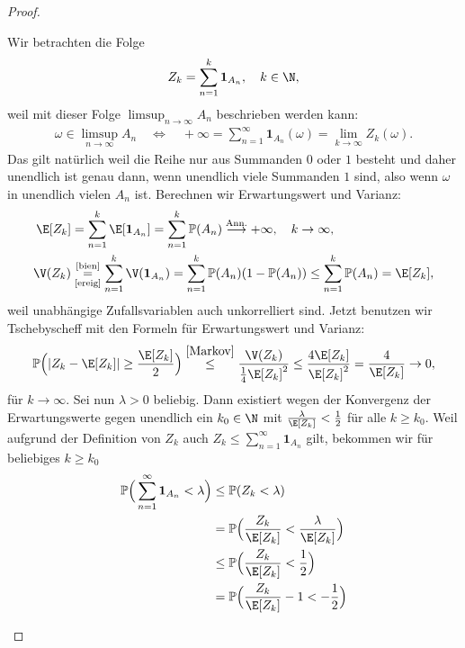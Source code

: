 \begin{proof}
\begin{enumerate}[label=(\roman*)]
		Wir betrachten die Folge
		\[ Z_k = \sum\limits_{n=1}^{k} \mathbf{1}_{A_n},\quad k\in\N, \]
		weil mit dieser Folge $\limsup_{n\to\infty} A_n$ beschrieben werden kann:
		\begin{align}\label{kyp}
			\omega \in \limsup\limits_{n \to \infty} A_n \quad \Leftrightarrow \quad +\infty=\sum\limits_{n=1}^{\infty} \mathbf{1}_{A_n}(\omega) = \lim\limits_{k \to \infty} Z_k(\omega).
		\end{align}
		Das gilt nat\"urlich weil die Reihe nur aus Summanden $0$ oder $1$ besteht und daher unendlich ist genau dann, wenn unendlich viele Summanden $1$ sind, also wenn $\omega$ in unendlich vielen $A_n$ ist. Berechnen wir Erwartungswert und Varianz:
		 \begin{align*}
		 	\E[Z_k] &= \sum\limits_{n=1}^{k} \E[\mathbf{1}_{A_n}] = \sum\limits_{n=1}^{k} \mathbb P(A_n) \overset{\text{Ann.}}{\longrightarrow}+\infty, \quad k \to \infty,\\
		 	\V(Z_k) &\underset{\text{\ref{ereig}}}{\overset{\text{\ref{bien}}}{=}} \sum\limits_{n=1}^{k}\V(\mathbf{1}_{A_n}) 
		 	= \sum\limits_{n=1}^{k} \mathbb P(A_n)(1-\mathbb P(A_n)) \leq \sum\limits_{n=1}^{k} \mathbb P(A_n) = \E[Z_k],
		 \end{align*}
		 weil unabh\"angige Zufallsvariablen auch unkorrelliert sind. Jetzt benutzen wir Tschebyscheff mit den Formeln f\"ur Erwartungswert und Varianz:
		  \begin{align}\label{absch}
		 	\mathbb{P}\Big(|Z_k - \E[Z_k]| \geq \frac{\E[Z_k]}{2}\Big) \overset{\ref{Markov}}{\leq}\frac{\V(Z_k)}{\frac{1}{4} \E[Z_k]^2} \leq \frac{4\E[Z_k]}{\E[Z_k]^2} = \frac{4}{\E[Z_k]} \to 0,
		 \end{align}
		 f\"ur $k\to\infty$. Sei nun $\lambda > 0$ beliebig. Dann existiert wegen der Konvergenz der Erwartungswerte gegen unendlich ein $k_0 \in \N$ mit $\frac{\lambda}{\E[Z_k]} < \frac{1}{2}$ f\"ur alle $k\geq k_0$.
		 Weil aufgrund der Definition von $Z_k$ auch $Z_k \leq \sum\limits_{n=1}^{\infty} \mathbf{1}_{A_n}$ gilt, bekommen wir für beliebiges $k \geq k_0$
		 \begin{align*}
		 	\mathbb{P}\Big(\sum\limits_{n=1}^{\infty} \mathbf{1}_{A_n} < \lambda \Big)& \leq \mathbb{P}(Z_k < \lambda)\\
			& = \mathbb{P}\Big(\frac{Z_k}{\E[Z_k]} < \frac{\lambda}{\E[Z_k]}\Big)\\
			& \leq \mathbb{P}\Big(\frac{Z_k}{\E[Z_k]} < \frac{1}{2}\Big)\\ 
		 	&= \mathbb{P}\Big(\frac{Z_k}{\E[Z_k]} - 1 < -\frac{1}{2}\Big)\\

\end{align*}
\end{enumerate}
\end{proof}
